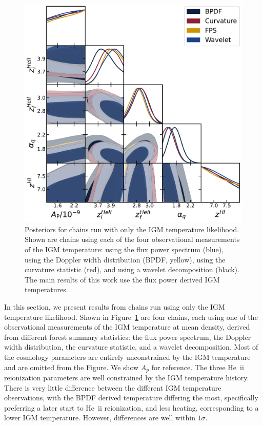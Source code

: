 \begin{figure}
    \centering
    \includegraphics[width=\textwidth]{figures/datasets_t0_corner.pdf}
    \caption{\label{fig:t0_datasets}
    Posteriors for chains run with only the IGM temperature likelihood.
    Shown are chains using each of the four observational measurements of the IGM temperature: using the flux power spectrum (blue), using the Doppler width distribution (BPDF, yellow), using the curvature statistic (red), and using a wavelet decomposition (black).
    The main results of this work use the flux power derived IGM temperatures.
    }
\end{figure}

In this section, we present results from chains run using only the IGM temperature likelihood.
Shown in Figure~\ref{fig:t0_datasets} are four chains, each using one of the observational measurements of the IGM temperature at mean density, derived from different \lya forest summary statistics: the flux power spectrum, the Doppler width distribution, the curvature statistic, and a wavelet decomposition.
Most of the cosmology parameters are entirely unconstrained by the IGM temperature and are omitted from the Figure.
We show $A_p$ for reference.
The three He~{\sc ii} reionization parameters are well constrained by the IGM temperature history.
There is very little difference between the different IGM temperature observations, with the BPDF derived temperature differing the most, specifically preferring a later start to He~{\sc ii} reionization, and less heating, corresponding to a lower IGM temperature.
However, differences are well within $1\sigma$.


